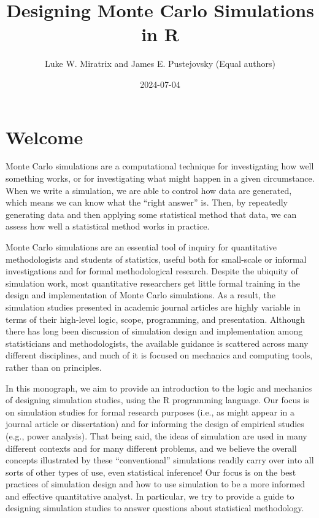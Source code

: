 \documentclass[
]{book}
\title{Designing Monte Carlo Simulations in R}
\author{Luke W. Miratrix and James E. Pustejovsky
(Equal authors)}
\date{2024-07-04}
\begin{document}
\maketitle

{
\setcounter{tocdepth}{1}
\tableofcontents
}
\chapter*{Welcome}\label{welcome}

Monte Carlo simulations are a computational technique for investigating how well something works, or for investigating what might happen in a given circumstance.
When we write a simulation, we are able to control how data are generated, which means we can know what the ``right answer'' is.
Then, by repeatedly generating data and then applying some statistical method that data, we can assess how well a statistical method works in practice.

Monte Carlo simulations are an essential tool of inquiry for quantitative methodologists and students of statistics, useful both for small-scale or informal investigations and for formal methodological research.
Despite the ubiquity of simulation work, most quantitative researchers get little formal training in the design and implementation of Monte Carlo simulations. As a result, the simulation studies presented in academic journal articles are highly variable in terms of their high-level logic, scope, programming, and presentation.
Although there has long been discussion of simulation design and implementation among statisticians and methodologists, the available guidance is scattered across many different disciplines, and much of it is focused on mechanics and computing tools, rather than on principles.

In this monograph, we aim to provide an introduction to the logic and mechanics of designing simulation studies, using the R programming language.
Our focus is on simulation studies for formal research purposes (i.e., as might appear in a journal article or dissertation) and for informing the design of empirical studies (e.g., power analysis).
That being said, the ideas of simulation are used in many different contexts and for many different problems, and we believe the overall concepts illustrated by these ``conventional'' simulations readily carry over into all sorts of other types of use, even statistical inference!
Our focus is on the best practices of simulation design and how to use simulation to be a more informed and effective quantitative analyst.
In particular, we try to provide a guide to designing simulation studies to answer questions about statistical methodology.
\end{document}
